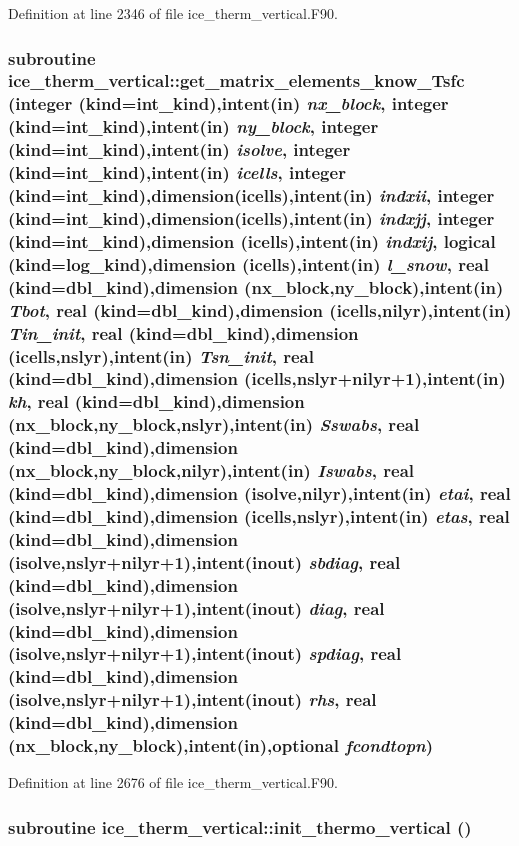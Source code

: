 Definition at line 2346 of file ice\_\-therm\_\-vertical.F90.\hypertarget{namespaceice__therm__vertical_ad636d3bbc26f9737173a670b7c43bfec}{
\subsubsection[{get\_\-matrix\_\-elements\_\-know\_\-Tsfc}]{\setlength{\rightskip}{0pt plus 5cm}subroutine ice\_\-therm\_\-vertical::get\_\-matrix\_\-elements\_\-know\_\-Tsfc (integer (kind=int\_\-kind),intent(in) {\em nx\_\-block}, \/  integer (kind=int\_\-kind),intent(in) {\em ny\_\-block}, \/  integer (kind=int\_\-kind),intent(in) {\em isolve}, \/  integer (kind=int\_\-kind),intent(in) {\em icells}, \/  integer (kind=int\_\-kind),dimension(icells),intent(in) {\em indxii}, \/  integer (kind=int\_\-kind),dimension(icells),intent(in) {\em indxjj}, \/  integer (kind=int\_\-kind),dimension (icells),intent(in) {\em indxij}, \/  logical (kind=log\_\-kind),dimension (icells),intent(in) {\em l\_\-snow}, \/  real (kind=dbl\_\-kind),dimension (nx\_\-block,ny\_\-block),intent(in) {\em Tbot}, \/  real (kind=dbl\_\-kind),dimension (icells,nilyr),intent(in) {\em Tin\_\-init}, \/  real (kind=dbl\_\-kind),dimension (icells,nslyr),intent(in) {\em Tsn\_\-init}, \/  real (kind=dbl\_\-kind),dimension (icells,nslyr+nilyr+1),intent(in) {\em kh}, \/  real (kind=dbl\_\-kind),dimension (nx\_\-block,ny\_\-block,nslyr),intent(in) {\em Sswabs}, \/  real (kind=dbl\_\-kind),dimension (nx\_\-block,ny\_\-block,nilyr),intent(in) {\em Iswabs}, \/  real (kind=dbl\_\-kind),dimension (isolve,nilyr),intent(in) {\em etai}, \/  real (kind=dbl\_\-kind),dimension (icells,nslyr),intent(in) {\em etas}, \/  real (kind=dbl\_\-kind),dimension (isolve,nslyr+nilyr+1),intent(inout) {\em sbdiag}, \/  real (kind=dbl\_\-kind),dimension (isolve,nslyr+nilyr+1),intent(inout) {\em diag}, \/  real (kind=dbl\_\-kind),dimension (isolve,nslyr+nilyr+1),intent(inout) {\em spdiag}, \/  real (kind=dbl\_\-kind),dimension (isolve,nslyr+nilyr+1),intent(inout) {\em rhs}, \/  real (kind=dbl\_\-kind),dimension (nx\_\-block,ny\_\-block),intent(in),optional {\em fcondtopn})}}
\label{namespaceice__therm__vertical_ad636d3bbc26f9737173a670b7c43bfec}


Definition at line 2676 of file ice\_\-therm\_\-vertical.F90.\hypertarget{namespaceice__therm__vertical_a1123b2b5ee24c8b82a26c5a831c88405}{
\subsubsection[{init\_\-thermo\_\-vertical}]{\setlength{\rightskip}{0pt plus 5cm}subroutine ice\_\-therm\_\-vertical::init\_\-thermo\_\-vertical ()}}
\label{namespaceice__therm__vertical_a1123b2b5ee24c8b82a26c5a831c88405}


